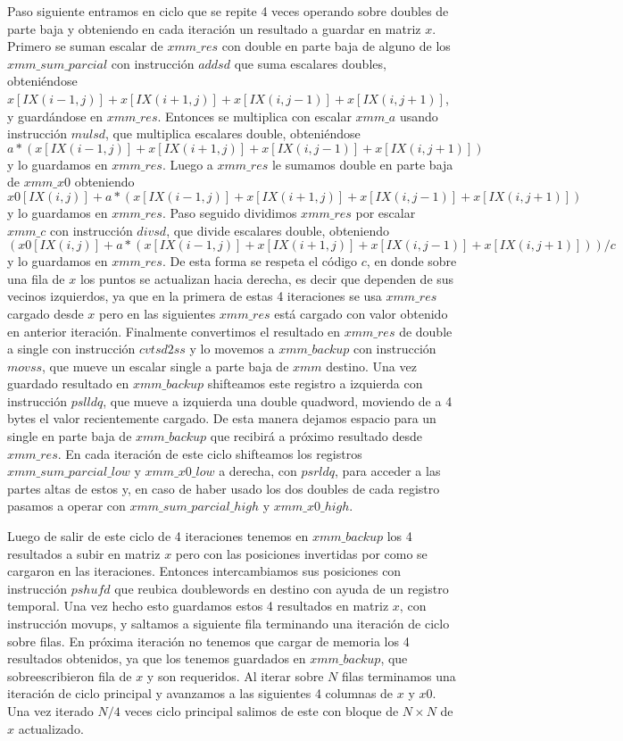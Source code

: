    Paso siguiente entramos en ciclo que se repite
 4 veces operando sobre doubles de parte baja y obteniendo en cada iteración un resultado a guardar 
 en matriz $x$. Primero se suman escalar de $xmm\_res$ con double en parte baja de 
 alguno de los $xmm\_sum\_parcial$ con instrucción $addsd$ que suma escalares doubles, obteniéndose 
  $x[IX(i-1,j)]+x[IX(i+1,j)]+x[IX(i,j-1)]+x[IX(i,j+1)]$, y guardándose en $xmm\_res$. Entonces se
 multiplica con escalar $xmm\_a$ usando instrucción $mulsd$, que multiplica escalares double,
 obteniéndose $a*(x[IX(i-1,j)]+x[IX(i+1,j)]+x[IX(i,j-1)]+x[IX(i,j+1)]) $ y lo guardamos en $xmm\_res$.
Luego a $xmm\_res$ le sumamos double en parte baja de $xmm\_x0$ obteniendo 
 $x0[IX(i,j)] + a*(x[IX(i-1,j)]+x[IX(i+1,j)]+x[IX(i,j-1)]+x[IX(i,j+1)])$ y lo guardamos en $xmm\_res$.
 Paso seguido dividimos $xmm\_res$ por escalar $xmm\_c$ con instrucción $divsd$, que divide escalares
 double, obteniendo $(x0[IX(i,j)] + a*(x[IX(i-1,j)]+x[IX(i+1,j)]+x[IX(i,j-1)]+x[IX(i,j+1)]))/c$
 y lo guardamos en $xmm\_res$. De esta forma se respeta el código $c$, en donde sobre una fila de $x$ los 
 puntos se actualizan hacia derecha, es decir que dependen de sus vecinos izquierdos, ya que en la 
 primera de estas 4 iteraciones se usa $xmm\_res$ cargado desde $x$ pero en las siguientes $xmm\_res$ está
 cargado con valor obtenido en anterior iteración. Finalmente convertimos el resultado en $xmm\_res$ 
 de double a single con instrucción $cvtsd2ss$ y lo movemos a $xmm\_backup$ con instrucción $movss$, que
 mueve un escalar single a parte baja de $xmm$ destino. 
Una vez guardado resultado en $xmm\_backup$ shifteamos este registro a izquierda con instrucción
 $pslldq$, que mueve a izquierda una double quadword, moviendo de a 4 bytes el valor recientemente
 cargado. De esta manera dejamos espacio para un single en parte baja de $xmm\_backup$ que recibirá a 
 próximo resultado desde $xmm\_res$. En cada iteración de este ciclo shifteamos los registros 
 $xmm\_sum\_parcial\_low$ y $xmm\_x0\_low$ a derecha, con $psrldq$, para acceder a las partes altas de estos y, en caso de haber usado los dos doubles de cada registro pasamos a operar con $xmm\_sum\_parcial\_high$ y 
 $xmm\_x0\_high$.

Luego de salir de este ciclo de 4 iteraciones tenemos en $xmm\_backup$ los 4 resultados a subir en 
 matriz $x$ pero con las posiciones invertidas por como se cargaron en las iteraciones. Entonces
 intercambiamos sus posiciones con instrucción $pshufd$ que reubica doublewords en destino con 
 ayuda de un registro temporal. Una vez hecho esto guardamos estos 4 resultados en matriz $x$, con instrucción movups, y 
 saltamos a siguiente fila terminando una iteración de ciclo sobre filas. En próxima iteración
 no tenemos que cargar de memoria los 4 resultados obtenidos, ya que los tenemos guardados en
 $xmm\_backup$, que sobreescribieron fila de $x$ y son requeridos.
 Al iterar sobre $N$ filas terminamos una iteración de ciclo principal y avanzamos a las 
 siguientes 4 columnas de $x$ y $x0$. Una vez iterado $N/4$ veces ciclo principal salimos de este con bloque de 
 $N\times N$ de $x$ actualizado.

